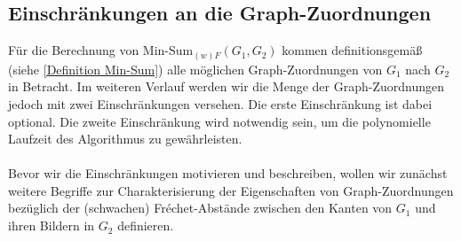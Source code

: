 \documentclass[a4paper, 12pt, twoside]{article}
\theoremstyle{Format1} %
\begin{document}
\subsection{Einschränkungen an die Graph-Zuordnungen} \label{Einschränkungen}
Für die Berechnung von Min-Sum$_{(w)F}(G_1, G_2)$ kommen definitionsgemäß (siehe \ref{Definition Min-Sum}) alle möglichen Graph-Zuordnungen von $G_1$ nach $G_2$ in Betracht.
Im weiteren Verlauf werden wir die Menge der Graph-Zuordnungen jedoch mit zwei Einschränkungen versehen.
Die erste Einschränkung ist dabei optional. Die zweite Einschränkung wird notwendig sein, um die polynomielle Laufzeit des Algorithmus zu gewährleisten.
\\
\\
Bevor wir die Einschränkungen motivieren und beschreiben, wollen wir zunächst weitere Begriffe zur Charakterisierung der Eigenschaften von Graph-Zuordnungen bezüglich
der (schwachen) Fréchet-Abstände zwischen den Kanten von $G_1$ und ihren Bildern in $G_2$ definieren.
\end{document}
